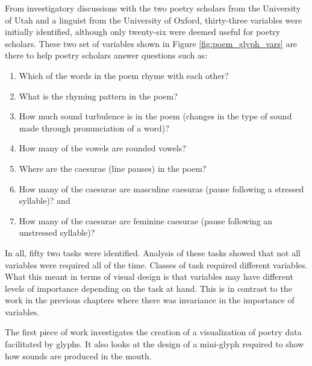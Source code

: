 From investigatory discussions with the two poetry scholars from the University of Utah and a linguist from the University of Oxford, thirty-three variables were initially identified, although only twenty-six were deemed useful for poetry scholars.
These two set of variables shown in Figure \ref{fig:poem_glyph_vars} are there to help poetry scholars answer questions such as: 
\begin{enumerate}
	\item Which of the words in the poem rhyme with each other?
	\vspace{-2mm}
	\item What is the rhyming pattern in the poem?
	\vspace{-2mm}
	\item How much sound turbulence is in the poem (changes in the type of sound made through pronunciation of a word)?
	\vspace{-2mm}
	\item How many of the vowels are rounded vowels?
	\vspace{-2mm}
	\item Where are the caesurae (line pauses) in the poem?
	\vspace{-2mm}
	\item How many of the caesurae are masculine caesuras (pause following a stressed syllable)? and
	\vspace{-2mm}
	\item How many of the caesurae are feminine caesurae (pause following an unstressed syllable)?
\end{enumerate}

In all, fifty two tasks were identified.
Analysis of these tasks showed that not all variables were required all of the time. 
Classes of task required different variables.
What this meant in terms of visual design is that variables may have different levels of importance depending on the task at hand. 
This is in contrast to the work in the previous chapters where there was invariance in the importance of variables.

The first piece of work investigates the creation of a visualization of poetry data facilitated by glyphs.
It also looks at the design of a mini-glyph required to show how sounds are produced in the mouth.

